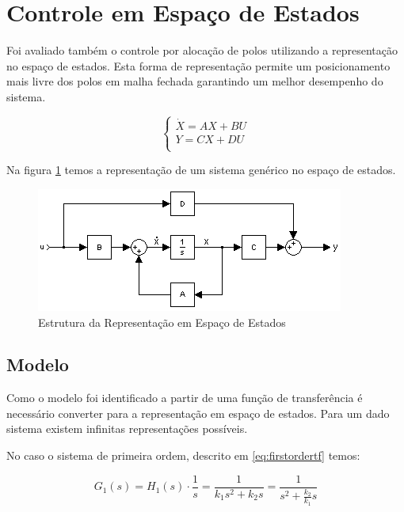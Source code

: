 \documentclass[a4paper,11pt]{article}
\begin{document}
\section{Controle em Espaço de Estados}

Foi avaliado também o controle por alocação de polos utilizando a representação no espaço de estados. Esta forma de representação permite um posicionamento mais livre dos polos em malha fechada garantindo um melhor desempenho do sistema.

\begin{equation}
\left\{
\begin{array}{c}
    \dot{X} = A X + B U \\
    Y = C X + D U \\
\end{array}
\right.
\end{equation}

Na figura \ref{fig:space_state_model} temos a representação de um sistema genérico no espaço de estados.

\begin{figure}[H]
    \centering
    \includegraphics{tex/img/space_state_model.png}
    \caption{Estrutura da Representação em Espaço de Estados}
    \label{fig:space_state_model}
\end{figure}

\subsection{Modelo}
Como o modelo foi identificado a partir de uma função de transferência é necessário converter para a representação em espaço de estados. Para um dado sistema existem infinitas representações possíveis.

No caso o sistema de primeira ordem, descrito em \ref{eq:firstordertf} temos:

$$
G_1(s) = H_1(s)\cdot \frac{1}{s} = \frac{1}{k_1 s^2+ k_2 s} = \frac{1}{s^2+ \frac{k_2}{k_1} s}
$$
\end{document}
